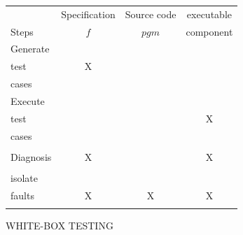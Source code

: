 \begin{center}
\begin{tabular}{|l||c|c|c|}
\hline
                 & Specification & Source code & executable\\
Steps            &     $f$       & $pgm$       & component\\
\hline
\hline
Generate         &               &             &       \\
test             &      X        &             &       \\
cases            &               &             &       \\
\hline
Execute          &               &             &       \\
test             &               &             &     X \\
cases            &               &             &       \\
\hline
                 &               &             &       \\
Diagnosis        &      X        &             &     X \\
                 &               &             &       \\
\hline
isolate          &               &             &       \\
faults           &      X        &      X      &    X  \\
                 &               &             &       \\
\hline
\end{tabular}
\end{center}





\newpage
\centerline{WHITE-BOX TESTING} 

\bigskip

